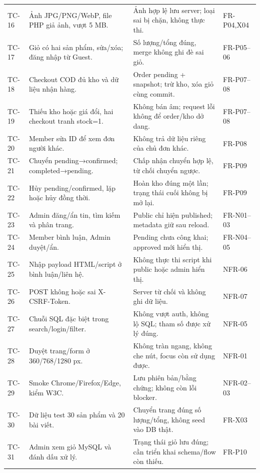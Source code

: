 {\begin{longtable}{@{}P{1.3cm}P{4.7cm}P{6.1cm}P{2.4cm}@{}}
TC-16 & Ảnh JPG/PNG/WebP, file PHP giả ảnh, vượt 5 MB. & Ảnh hợp lệ lưu server; loại sai bị chặn, không thực thi. & FR-P04,X04\\
TC-17 & Giỏ có hai sản phẩm, sửa/xóa; đăng nhập từ Guest. & Số lượng/tổng đúng, merge không ghi đè sai giỏ. & FR-P05–06\\
TC-18 & Checkout COD đủ kho và dữ liệu nhận hàng. & Order pending + snapshot; trừ kho, xóa giỏ cùng commit. & FR-P07–08\\
TC-19 & Thiếu kho hoặc giá đổi, hai checkout tranh stock=1. & Không bán âm; request lỗi không để order/kho dở dang. & FR-P07–08\\
TC-20 & Member sửa ID để xem đơn người khác. & Không trả dữ liệu riêng của chủ đơn khác. & FR-P08\\
TC-21 & Chuyển pending→confirmed; completed→pending. & Chấp nhận chuyển hợp lệ, từ chối chuyển ngược. & FR-P09\\
TC-22 & Hủy pending/confirmed, lặp hoặc hủy đồng thời. & Hoàn kho đúng một lần; trạng thái cuối không bị mở lại. & FR-P09\\
TC-23 & Admin đăng/ẩn tin, tìm kiếm và phân trang. & Public chỉ hiện published; metadata giữ sau reload. & FR-N01–03\\
TC-24 & Member bình luận, Admin duyệt/ẩn. & Pending chưa công khai; approved mới hiển thị. & FR-N04–05\\
TC-25 & Nhập payload HTML/script ở bình luận/liên hệ. & Không thực thi script khi public hoặc admin hiển thị. & NFR-06\\
TC-26 & POST không hoặc sai X-CSRF-Token. & Server từ chối và không ghi dữ liệu. & NFR-07\\
TC-27 & Chuỗi SQL đặc biệt trong search/login/filter. & Không vượt auth, không lộ SQL; tham số được xử lý đúng. & NFR-05\\
TC-28 & Duyệt trang/form ở 360/768/1280 px. & Không tràn ngang, không che nút, focus còn sử dụng được. & NFR-01\\
TC-29 & Smoke Chrome/Firefox/Edge, kiểm W3C. & Lưu phiên bản/bằng chứng; không còn lỗi blocker. & NFR-02–03\\
TC-30 & Dữ liệu test 30 sản phẩm và 20 bài viết. & Chuyển trang đúng số lượng/tổng, không seed vào DB thật. & FR-X03\\
TC-31 & Admin xem giỏ MySQL và đánh dấu xử lý. & Trạng thái giỏ lưu đúng; cần triển khai schema/flow còn thiếu. & FR-P10\\
\bottomrule\end{longtable}
}
